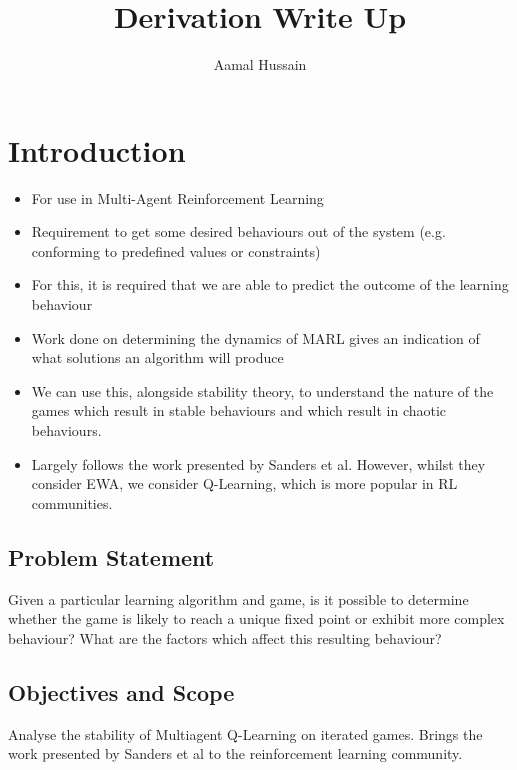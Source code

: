 \documentclass{article}
\title{Derivation Write Up}
\author{Aamal Hussain}
\begin{document}
	\maketitle
	
	\section{Introduction} %
	\label{sec:introduction}

	\begin{itemize}
			\item For use in Multi-Agent Reinforcement Learning
			\item Requirement to get some desired behaviours out of the system (e.g. conforming to
			predefined values or constraints)
			\item For this, it is required that we are able to predict the outcome of the learning
			behaviour
			\item Work done on determining the dynamics of MARL gives an indication of what
			solutions an algorithm will produce
			\item We can use this, alongside stability theory, to understand the nature of the games
			which result in stable behaviours and which result in chaotic behaviours.
			\item Largely follows the work presented by Sanders et al. However, whilst they consider
			EWA, we consider Q-Learning, which is more popular in RL communities.
	\end{itemize}	

	\subsection{Problem Statement} %
	\label{sub:problem_statement}
	
	Given a particular learning algorithm and game, is it possible to determine whether the game is
	likely to reach a unique fixed point or exhibit more complex behaviour? What are the factors
	which affect this resulting behaviour?

	
	\subsection{Objectives and Scope} %
	\label{sub:objectives_and_scope}

	Analyse the stability of Multiagent Q-Learning on iterated games. Brings the work presented by
	Sanders et al to the reinforcement learning community.
\end{document}
